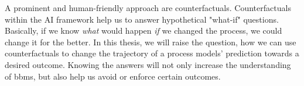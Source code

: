 \documentclass[./../../paper.tex]{subfiles}
\begin{document}
A prominent and human-friendly approach are counterfactuals\needscite. Counterfactuals within the AI framework help us to answer hypothetical "what-if" questions. Basically, if we know \emph{what} would happen \emph{if} we changed the process, we could change it for the better. In this thesis, we will raise the question, how we can use counterfactuals to change the trajectory of a process models' prediction towards a desired outcome. Knowing the answers will not only increase the understanding of \glspl{bbm}, but also help us avoid or enforce certain outcomes. 
\end{document}
